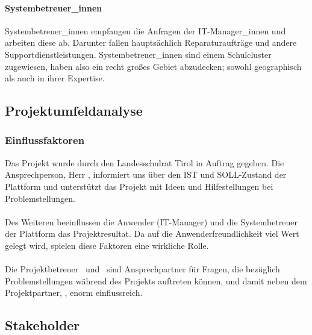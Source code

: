 \paragraph{Systembetreuer\_innen}
Systembetreuer\_innen empfangen die Anfragen der IT-Manager\_innen und arbeiten diese ab. Darunter fallen hauptsächlich Reparaturaufträge und andere Supportdienstleistungen. Systembetreuer\_innen sind einem Schulcluster zugewiesen, haben also ein recht großes Gebiet abzudecken; sowohl geographisch als auch in ihrer Expertise.

\subsection{Projektumfeldanalyse}
\subsubsection{Einflussfaktoren}
Das Projekt wurde durch den Landesschulrat Tirol in Auftrag gegeben. Die Ansprechperson, Herr \getHammerl, informiert uns über den IST und SOLL-Zustand der Plattform und unterstützt das Projekt mit Ideen und Hilfestellungen bei Problemstellungen.
\paragraph{}
Des Weiteren beeinflussen die Anwender (IT-Manager) und die Systembetreuer der Plattform das Projektresultat. Da auf die Anwenderfreundlichkeit viel Wert gelegt wird, spielen diese Faktoren eine wirkliche Rolle.
\paragraph{}
Die Projektbetreuer \getSteff\ und \getAlex\ sind Ansprechpartner für Fragen, die bezüglich Problemstellungen während des Projekts auftreten können, und damit neben dem Projektpartner, \getHammerl, enorm einflussreich.


\newpage
\subsection{Stakeholder}
